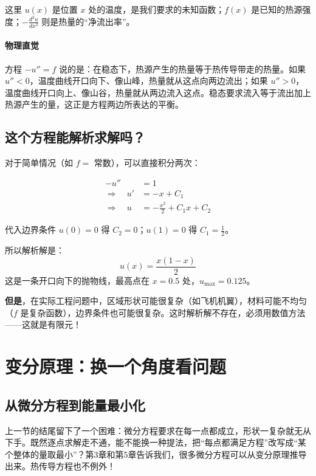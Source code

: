 这里 $u(x)$ 是位置 $x$ 处的温度，是我们要求的未知函数；$f(x)$ 是已知的热源强度；$-\frac{d^2u}{dx^2}$ 则是热量的“净流出率”。

\paragraph{物理直觉}

方程 $-u'' = f$ 说的是：在稳态下，热源产生的热量等于热传导带走的热量。如果 $u'' < 0$，温度曲线开口向下、像山峰，热量就从这点向两边流出；如果 $u'' > 0$，温度曲线开口向上、像山谷，热量就从两边流入这点。稳态要求流入等于流出加上热源产生的量，这正是方程两边所表达的平衡。

\subsection{这个方程能解析求解吗？}

对于简单情况（如 $f = $ 常数），可以直接积分两次：

\begin{example}[$f = 1$ 的解析解]
\begin{align}
-u'' &= 1 \\
\Rightarrow \quad u' &= -x + C_1 \\
\Rightarrow \quad u &= -\frac{x^2}{2} + C_1 x + C_2
\end{align}

代入边界条件 $u(0) = 0$ 得 $C_2 = 0$；$u(1) = 0$ 得 $C_1 = \frac{1}{2}$。

所以解析解是：
\[
u(x) = \frac{x(1-x)}{2}
\]
这是一条开口向下的抛物线，最高点在 $x = 0.5$ 处，$u_{\max} = 0.125$。
\end{example}

\textbf{但是}，在实际工程问题中，区域形状可能很复杂（如飞机机翼），材料可能不均匀（$f$ 是复杂函数），边界条件也可能很复杂。这时解析解不存在，必须用数值方法——这就是有限元！

\section{变分原理：换一个角度看问题}

\subsection{从微分方程到能量最小化}

上一节的结尾留下了一个困难：微分方程要求在每一点都成立，形状一复杂就无从下手。既然逐点求解走不通，能不能换一种提法，把“每点都满足方程”改写成“某个整体的量取最小”？第3章和第5章告诉我们，很多微分方程可以从变分原理推导出来。热传导方程也不例外！

